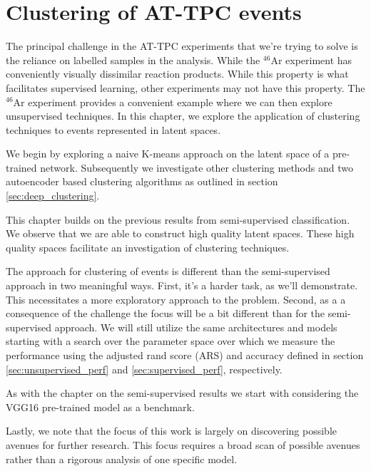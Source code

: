 \chapter{Clustering of AT-TPC events}\label{chap:clustering}

The principal challenge in the AT-TPC experiments that we're trying to solve is the reliance on labelled samples in the analysis. While the ${}^{46}$Ar experiment has conveniently visually dissimilar reaction products. While this property is what facilitates supervised learning, other experiments may not have this property. The ${}^{46}$Ar experiment provides a convenient example where we can then explore unsupervised techniques. In this chapter, we explore the application of clustering techniques to events represented in latent spaces. 

We begin by exploring a naive K-means approach on the latent space of a pre-trained network. Subsequently we investigate other clustering methods and two autoencoder based clustering algorithms as outlined in section \ref{sec:deep_clustering}.

This chapter builds on the previous results from semi-supervised classification. We observe that we are able to construct high quality latent spaces. These high quality spaces facilitate an investigation of clustering techniques. 

The approach for clustering of events is different than the semi-supervised approach in two meaningful ways. First, it's a harder task, as we'll demonstrate. This necessitates a more exploratory approach to the problem. Second, as a a consequence of the challenge the focus will be a bit different than for the semi-supervised approach. We will still utilize the same architectures and models starting with a search over the parameter space over which we measure the performance using the adjusted rand score (ARS) and accuracy defined in section \ref{sec:unsupervised_perf} and \ref{sec:supervised_perf}, respectively.

As with the chapter on the semi-supervised results we start with considering the VGG16 pre-trained model as a benchmark.

Lastly, we note that the focus of this work is largely on discovering possible avenues for further research. This focus requires a broad scan of possible avenues rather than a rigorous analysis of one specific model.